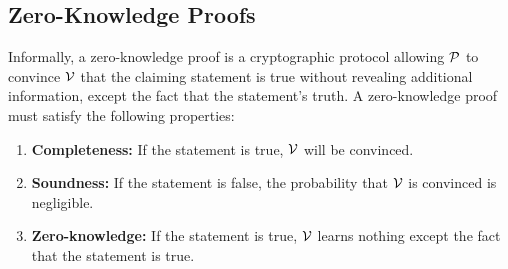 \subsection{Zero-Knowledge Proofs}
Informally, a zero-knowledge proof is a cryptographic protocol allowing $\mathcal{P}$ to convince $\mathcal{V}$ that the claiming statement is true without revealing additional information, except the fact that the statement's truth. A zero-knowledge proof must satisfy the following properties:
\begin{enumerate}
    \item \textbf{Completeness:} If the statement is true, $\mathcal{V}$ will be convinced.
    \item \textbf{Soundness:} If the statement is false, the probability that $\mathcal{V}$ is convinced is negligible.
    \item \textbf{Zero-knowledge:} If the statement is true, $\mathcal{V}$ learns nothing except the fact that the statement is true.
\end{enumerate}

